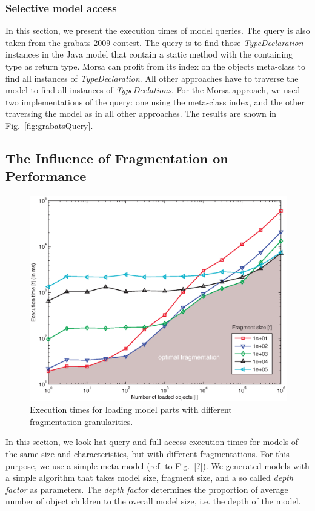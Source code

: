 \subsubsection*{Selective model access}

In this section, we present the execution times of model queries. The query is also taken from the grabats 2009 contest. The query is to find those \emph{TypeDeclaration} instances in the Java model that contain a static method with the containing type as return type. Morsa can profit from its index on the objects meta-class to find all instances of \emph{TypeDeclaration}. All other approaches have to traverse the model to find all instances of \emph{TypeDeclations}. For the Morsa approach, we used two implementations of the query: one using the meta-class index, and the other traversing the model as in all other approaches. The results are shown in Fig.~\ref{fig:grabatsQuery}.



\subsection{The Influence of Fragmentation on Performance}

\begin{figure}
  \centering
  \includegraphics[width=0.65\linewidth]{figures/measureTimesExtra}
  \caption{Execution times for loading model parts with different fragmentation granularities.}
  \label{fig:measureTimeExtra}
\end{figure}

In this section, we look hat query and full access execution times for models of the same size and characteristics, but with different fragmentations. For this purpose, we use a simple meta-model (ref. to Fig.~\ref{?}). We generated models with a simple algorithm that takes model size, fragment size, and a so called \emph{depth factor} as parameters. The \emph{depth factor} determines the proportion of average number of object children to the overall model size, i.e. the depth of the model. 